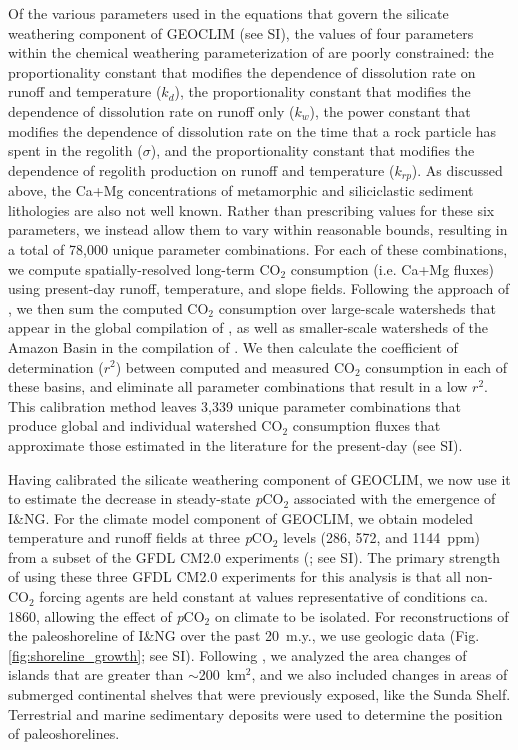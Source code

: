 \documentclass[11pt,letterpaper]{article}
\newcommand{\pCOtwo}{\textit{p}CO$_{2}$\xspace}
\newcommand{\COtwo}{CO$_{2}$\xspace}
\begin{document}
Of the various parameters used in the equations that govern the silicate weathering component of GEOCLIM (see SI), the values of four parameters within the chemical weathering parameterization of \cite{West2012a} are poorly constrained: the proportionality constant that modifies the dependence of dissolution rate on runoff and temperature ($k_{d}$), the proportionality constant that modifies the dependence of dissolution rate on runoff only ($k_{w}$), the power constant that modifies the dependence of dissolution rate on the time that a rock particle has spent in the regolith ($\sigma$), and the proportionality constant that modifies the dependence of regolith production on runoff and temperature ($k_{rp}$). As discussed above, the Ca+Mg concentrations of metamorphic and siliciclastic sediment lithologies are also not well known. Rather than prescribing values for these six parameters, we instead allow them to vary within reasonable bounds, resulting in a total of 78,000 unique parameter combinations. For each of these combinations, we compute spatially-resolved long-term \COtwo consumption (i.e. Ca+Mg fluxes) using present-day runoff, temperature, and slope fields. Following the approach of \citet{Maffre2018a}, we then sum the computed \COtwo consumption over large-scale watersheds that appear in the global compilation of \citet{Gaillardet1999a}, as well as smaller-scale watersheds of the Amazon Basin in the compilation of \citet{Moquet2018a}. We then calculate the coefficient of determination ($r^{2}$) between computed and measured \COtwo consumption in each of these basins, and eliminate all parameter combinations that result in a low $r^{2}$. This calibration method leaves 3,339 unique parameter combinations that produce global and individual watershed \COtwo consumption fluxes that approximate those estimated in the literature for the present-day (see SI).

Having calibrated the silicate weathering component of GEOCLIM, we now use it to estimate the decrease in steady-state \pCOtwo associated with the emergence of I\&NG. For the climate model component of GEOCLIM, we obtain modeled temperature and runoff fields at three \pCOtwo levels (286, 572, and 1144~ppm) from a subset of the GFDL CM2.0 experiments (\citealp{Delworth2006a, Delworth2006b}; see SI). The primary strength of using these three GFDL CM2.0 experiments for this analysis is that all non-\COtwo forcing agents are held constant at values representative of conditions ca. 1860, allowing the effect of \pCOtwo on climate to be isolated. For reconstructions of the paleoshoreline of I\&NG over the past 20~m.y., we use geologic data (Fig. \ref{fig:shoreline_growth}; see SI). Following \citet{Molnar2015a}, we analyzed the area changes of islands that are greater than $\sim$200~km$^{2}$, and we also included changes in areas of submerged continental shelves that were previously exposed, like the Sunda Shelf. Terrestrial and marine sedimentary deposits were used to determine the position of paleoshorelines.
\end{document}
